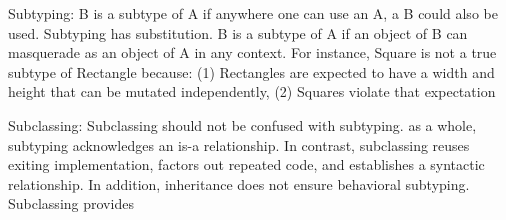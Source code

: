 Subtyping:
B is a subtype of A if anywhere one can use an A, a B could also be used.
Subtyping has substitution. B is a subtype of A if an object of B can masquerade as an object of A in any context.
For instance, Square is not a true subtype of Rectangle because: (1) Rectangles are expected to have a width and height
that can be mutated independently, (2) Squares violate that expectation

Subclassing:
Subclassing should not be confused with subtyping. as a whole, subtyping acknowledges an is-a relationship.
In contrast, subclassing reuses exiting implementation, factors out repeated code, and establishes a syntactic relationship.
In addition, inheritance does not ensure behavioral subtyping.
Subclassing provides 




